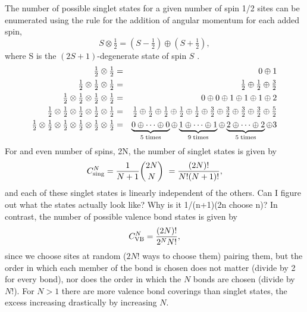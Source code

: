 The number of possible singlet states for a given number of spin 1/2 sites can be enumerated
using the rule for the addition of angular momentum for each added spin,
\begin{equation}
	S\otimes \tfrac{1}{2}  = \left(S-\tfrac{1}{2}\right)\oplus\left(S+\tfrac{1}{2}\right),
\end{equation}
where S is the $(2S+1)$-degenerate state of spin $S$ \cite{Beach2006}.
\begin{eqnarray}
	\tfrac{1}{2} \otimes \tfrac{1}{2}  &=& 0 \oplus 1\nonumber \\ 
	\tfrac{1}{2} \otimes \tfrac{1}{2}  \otimes \tfrac{1}{2} &=& 
	\tfrac{1}{2} \oplus  \tfrac{1}{2} \oplus  \tfrac{3}{2} \nonumber \\
	\tfrac{1}{2} \otimes \tfrac{1}{2}  \otimes \tfrac{1}{2} \otimes \tfrac{1}{2} &=& 
	0 \oplus 0 \oplus 1 \oplus 1 \oplus 1 \oplus 2 \nonumber \\
	\tfrac{1}{2} \otimes \tfrac{1}{2}  \otimes \tfrac{1}{2}  \otimes \tfrac{1}{2}  \otimes \tfrac{1}{2}&=& 
	\tfrac{1}{2} \oplus \tfrac{1}{2} \oplus \tfrac{1}{2} \oplus \tfrac{1}{2} \oplus \tfrac{1}{2} \oplus  
	\tfrac{3}{2} \oplus \tfrac{3}{2} \oplus \tfrac{3}{2} \oplus \tfrac{3}{2} \oplus
	  \tfrac{5}{2} \nonumber \\
	\tfrac{1}{2} \otimes \tfrac{1}{2}  \otimes \tfrac{1}{2} \otimes \tfrac{1}{2} \otimes \tfrac{1}{2}
	\otimes \tfrac{1}{2} &=& 
	\underbrace{0 \oplus\cdots \oplus 0}_{5 \rm{\; times}} \oplus 
	\underbrace{1 \oplus \cdots \oplus 1}_{9 \rm{\; times}} \oplus 
	\underbrace{2 \oplus \cdots \oplus 2}_{5 \rm{\; times}} 
	\oplus 3 \nonumber
\end{eqnarray}
For and even number of spins, 2N, the number of singlet states is given by 
\begin{equation}
	C_{\rm{sing}}^N = \frac{1}{N+1}\binom{2N}{N}\ = \frac{(2N)!}{N!(N+1)!},
\end{equation}  
and each of these singlet states is linearly independent of the others.
{\color{red} Can I figure out what the states actually look like?  Why is it 1/(n+1)(2n choose n)?}
In contrast, the number of possible valence bond states is given by
\begin{equation}
	C_{\rm{VB}}^N =
	\frac{(2N)!}{2^NN!},
\end{equation}
since we choose sites at random ($2N!$ ways to choose them) pairing them, but the order 
in which each member of the bond is chosen does not matter (divide by 2 for every bond), 
nor does the order in which the $N$ bonds are chosen (divide by $N!$).
For $N>1$ there are more valence bond coverings than singlet states, the excess increasing 
drastically by increasing $N$.  

